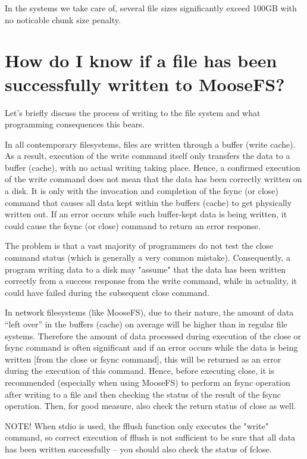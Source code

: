 \documentclass[a4paper,11pt,english]{report}
\begin{document}
		In the systems we take care of, several file sizes significantly exceed 100GB with no noticable chunk size penalty.
		
		
		\section{How do I know if a file has been successfully written to MooseFS?}
		Let's briefly discuss the process of writing to the file system and what programming consequences this bears. 
		
		In all contemporary filesystems, files are written through a buffer (write cache). As a result, execution of the write command itself only transfers the data to a buffer (cache), with no actual writing taking place. Hence, a confirmed execution of the write command does not mean that the data has been correctly written on a disk. It is only with the invocation and completion of the fsync (or close) command that causes all data kept within the buffers (cache) to get physically written out. If an error occurs while such buffer-kept data is being written, it could cause the fsync (or close) command to return an error response.   
		
		The problem is that a vast majority of programmers do not test the close command status (which is generally a very common mistake). Consequently, a program writing data to a disk may "assume" that the data has been written correctly from a success response from the write command, while in actuality, it could have failed during the subsequent close command. 
		
		In network filesystems (like MooseFS), due to their nature, the amount of data ``left over'' in the buffers (cache) on average will be higher than in regular file systems. Therefore the amount of data processed during execution of the close or fsync command is often significant and if an error occurs while the data is being written [from the close or fsync command], this will be returned as an error during the execution of this command. Hence, before executing close, it is recommended (especially when using MooseFS) to perform an fsync operation after writing to a file and then checking the status of the result of the fsync operation. Then, for good measure, also check the return status of close as well. 
		
		NOTE! When stdio is used, the fflush function only executes the "write" command, so correct execution of fflush is not sufficient to be sure that all data has been written successfully -- you should also check the status of fclose. 
		
\end{document}
